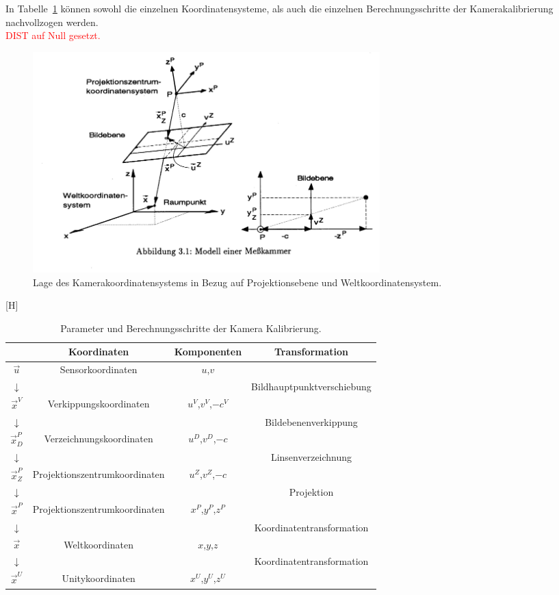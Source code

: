  In Tabelle~\ref{tab:camCalibParam} können sowohl die einzelnen Koordinatensysteme, als auch die einzelnen Berechnungsschritte der Kamerakalibrierung nachvollzogen werden. \\
\textcolor{red}{DIST auf Null gesetzt.}


\begin{figure}[H]
		\center 
		\includegraphics[width=0.65\textwidth , trim = 0mm 65mm 270mm 0mm, clip]{Bilder/cameraCalib.jpg}
			\caption{Lage des Kamerakoordinatensystems in Bezug auf Projektionsebene und Weltkoordinatensystem. 					\cite{Meisel:77890}}
			\label{fig:cameraCalib}
	\end{figure}[H]
	
\begin{table}
	\centering
	\begin{tabular}{|c|c|c|c|}
		\hline
		\Absatzbox{}
		& \textbf{Koordinaten} & \textbf{Komponenten}&\textbf{Transformation}\\
		\hline
		$\overrightarrow{u}$ & Sensorkoordinaten &$u$,$v$ & \\
		\cline{2-4}
		$\downarrow$ & & & Bildhauptpunktverschiebung\\
		\cline{2-4}		
		$\overrightarrow{x}^V$ &Verkippungskoordinaten &$u^V$,$v^V$,$-c^V$& \\
		\cline{2-4}
		$\downarrow$ & & & Bildebenenverkippung\\
		\cline{2-4}	
		$\overrightarrow{x}^P_D$ & Verzeichnungskoordinaten &$u^D$,$v^D$,$-c$& \\
		\cline{2-4}
		$\downarrow$ & & & Linsenverzeichnung\\
		\cline{2-4}
		$\overrightarrow{x}^P_Z$ & Projektionszentrumkoordinaten &$u^Z$,$v^Z$,$-c$& \\
		\cline{2-4}
		$\downarrow$ & & & Projektion\\
		\cline{2-4}
		$\overrightarrow{x}^P$ & Projektionszentrumkoordinaten &$x^P$,$y^P$,$z^P$& \\
		\cline{2-4}
		$\downarrow$ & & & Koordinatentransformation\\
		\cline{2-4}
		$\overrightarrow{x}$ & Weltkoordinaten &$x$,$y$,$z$& \\
		\cline{2-4}
		$\downarrow$ & & & Koordinatentransformation\\
		\cline{2-4}		
		$\overrightarrow{x}^U$ & Unitykoordinaten &$x^U$,$y^U$,$z^U$& \\
		\hline
	\end{tabular}
	\caption{Parameter und Berechnungsschritte der Kamera Kalibrierung.\cite{Meisel:77890}}
	\label{tab:camCalibParam}
\end{table}

